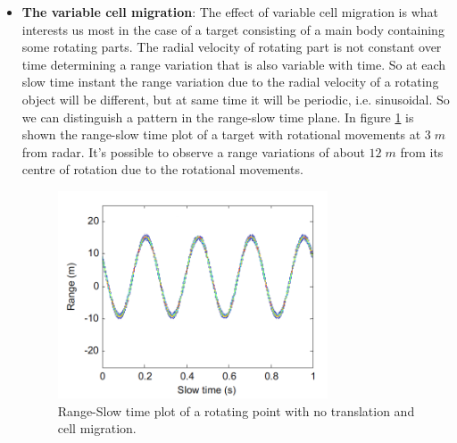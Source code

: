 \begin{itemize}
         
    \item \textbf{The variable cell migration}: The effect of variable cell migration is what interests us most in the case of a target consisting of a main body containing some rotating parts. The radial velocity of rotating part is not constant over time determining a range variation that is also variable with time. So at each slow time instant the range variation due to the radial velocity of a rotating object will be different, but at same time it will be periodic, i.e. sinusoidal. So we can distinguish a pattern in the range-slow time plane. In figure \ref{var_range_slow_time_fig} is shown the range-slow time plot of a  target with rotational movements at $3\;m$ from radar. It's possible to observe a range variations of about $12\;m$ from its centre of rotation due to the rotational movements.
    \begin{figure}[h!]
     \centering
     \includegraphics[width=8cm]{Time-frequency analysis-chap3/img/var_slow_time.png}
     \caption{Range-Slow time plot of a rotating point with no translation and cell migration.}
     \label{var_range_slow_time_fig}
     \end{figure}
    
\end{itemize}

